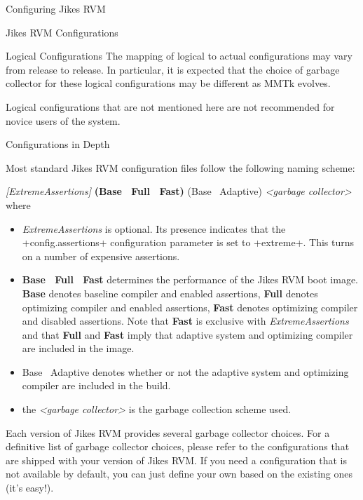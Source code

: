 \begin{section}{Configuring Jikes RVM}
\begin{subsection}{Jikes RVM Configurations}
\begin{subsubsection}{Logical Configurations}
The mapping of logical to actual configurations may vary from release to release. In particular, it is expected that the choice of garbage collector for these logical configurations may be different as MMTk evolves.

Logical configurations that are not mentioned here are not recommended for novice users of the system.

\end{subsubsection}

\begin{subsubsection}{Configurations in Depth}

Most standard Jikes RVM configuration files follow the following naming scheme:

\textit{[ExtremeAssertions]} \textbf{(Base \textbar\ Full \textbar\ Fast)} (Base \textbar\ Adaptive) \textit{\textless garbage collector\textgreater }
where
\begin{itemize}
  \item \textit{ExtremeAssertions} is optional. Its presence indicates that the \spverb+config.assertions+ configuration parameter is set to \spverb+extreme+. This turns on a number of expensive assertions.
  \item \textbf{Base \textbar\ Full \textbar\ Fast} determines the performance of the Jikes RVM boot image. \textbf{Base} denotes baseline compiler and enabled assertions, \textbf{Full} denotes optimizing compiler and enabled assertions, \textbf{Fast} denotes optimizing compiler and disabled assertions. Note that \textbf{Fast} is exclusive with \textit{ExtremeAssertions} and that \textbf{Full} and \textbf{Fast} imply that adaptive system and optimizing compiler are included in the image.
  \item Base \textbar\ Adaptive denotes whether or not the adaptive system and optimizing compiler are included in the build.
  \item the \textit{\textless garbage collector\textgreater} is the garbage collection scheme used.
\end{itemize}

Each version of Jikes RVM provides several garbage collector choices. For a definitive list of garbage collector choices, please refer to the configurations that are shipped with your version of Jikes RVM. If you need a configuration that is not available by default, you can just define your own based on the existing ones (it's easy!).


\end{subsubsection}
\end{subsection}
\end{section}

